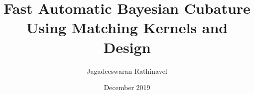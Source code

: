\documentclass{iitthesis}          %
\begin{document}
\setlength\abovedisplayskip{0pt}
\setlength{\belowdisplayskip}{0pt}

\title{Fast Automatic Bayesian Cubature Using Matching Kernels and Design
}
%



\author{Jagadeeswaran Rathinavel       %
}



\date{December 2019}

\maketitle


\prelimpages         %
\end{document}

